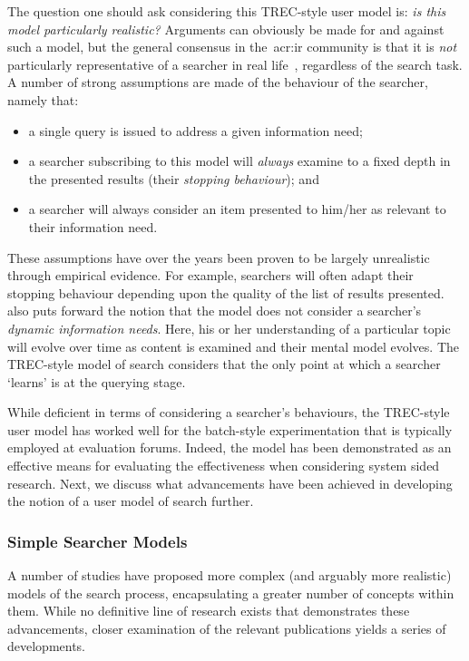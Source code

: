 The question one should ask considering this TREC-style user model is: \emph{is this model particularly realistic?} Arguments can obviously be made for and against such a model, but the general consensus in the~\gls{acr:ir} community is that it is \emph{not} particularly representative of a searcher in real life~\citep{azzopardi2010simulation}, regardless of the search task. A number of strong assumptions are made of the behaviour of the searcher, namely that:

\begin{itemize}
    \item{a single query is issued to address a given information need;}
    \item{a searcher subscribing to this model will \emph{always} examine to a fixed depth in the presented results (their \emph{stopping behaviour}); and}
    \item{a searcher will always consider an item presented to him/her as relevant to their information need.}
\end{itemize}

These assumptions have over the years been proven to be largely unrealistic through empirical evidence. For example, searchers will often adapt their stopping behaviour depending upon the quality of the list of results presented.~\cite{borlund2003iir_model} also puts forward the notion that the model does not consider a searcher's \emph{dynamic information needs}. Here, his or her understanding of a particular topic will evolve over time as content is examined and their mental model evolves. The TREC-style model of search considers that the only point at which a searcher `learns' is at the querying stage.

While deficient in terms of considering a searcher's behaviours, the TREC-style user model has worked well for the batch-style experimentation that is typically employed at evaluation forums. Indeed, the model has been demonstrated as an effective means for evaluating the effectiveness when considering system sided research. Next, we discuss what advancements have been achieved in developing the notion of a user model of search further.

\subsubsection{Simple Searcher Models}\label{sec:stopping_background:models:conceptual:simple}
A number of studies have proposed more complex (and arguably more realistic) models of the search process, encapsulating a greater number of concepts within them. While no definitive line of research exists that demonstrates these advancements, closer examination of the relevant publications yields a series of developments.

